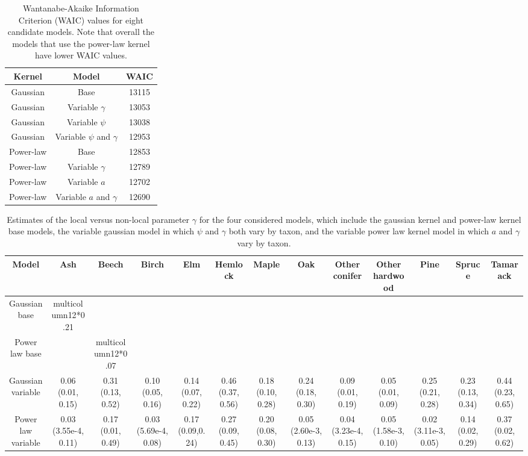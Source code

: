 
\begin{table}
\begin{center}
\begin{tabular}{ccc} 
\toprule
Kernel    & Model                        & WAIC  \\ \midrule
Gaussian  & Base                         & 13115 \\
Gaussian  & Variable $\gamma$            & 13053 \\
Gaussian  & Variable $\psi$              & 13038 \\   
Gaussian  & Variable $\psi$ and $\gamma$ & 12953 \\
Power-law & Base                         & 12853 \\
Power-law & Variable $\gamma$            & 12789 \\
Power-law & Variable $a$                 & 12702 \\
Power-law & Variable $a$ and $\gamma$    & 12690 \\  \bottomrule
\end{tabular}
\caption{Wantanabe-Akaike Information Criterion (WAIC) values for
  eight candidate models. Note that overall the models that use the
  power-law kernel have lower WAIC values.}
\end{center}
\label{table:WAIC}
\vspace{2cm}
\end{table}


\begin{table}
\begin{center}
\begin{tabular}{ccccccccccccc} 
\toprule
Model & Ash & Beech & Birch & Elm & Hemlock & Maple & Oak & Other conifer &  Other hardwood & Pine & Spruce & Tamarack \\ \midrule
Gaussian base      & multicolumn{12}{*}{0.21} \\   
Power law base     & & multicolumn{12}{*}{0.07} \\   
Gaussian variable  & 0.06 (0.01, 0.15) & 0.31 (0.13, 0.52) & 0.10 (0.05, 0.16) & 0.14 (0.07, 0.22) & 0.46 (0.37, 0.56) & 0.18 (0.10, 0.28) & 0.24 (0.18, 0.30) & 0.09 (0.01, 0.19) & 0.05 (0.01, 0.09) & 0.25 (0.21, 0.28) & 0.23 (0.13, 0.34) & 0.44 (0.23, 0.65) \\   
Power law variable & 0.03 (3.55e-4, 0.11) & 0.17 (0.01, 0.49) & 0.03 (5.69e-4, 0.08) & 0.17 (0.09,0.24)& 0.27 (0.09, 0.45) & 0.20 (0.08, 0.30) & 0.05 (2.60e-3, 0.13) & 0.04 (3.23e-4, 0.15) & 0.05 (1.58e-3, 0.10) & 0.02 (3.11e-3, 0.05) & 0.14 (0.02, 0.29) & 0.37 (0.02, 0.62) \\   \bottomrule
\end{tabular}
\caption{Estimates of the local versus non-local parameter $\gamma$ for the four considered models, which include the gaussian kernel and power-law kernel base models, the variable gaussian model in which $\psi$ and $\gamma$ both vary by taxon, and the variable power law kernel model in which $a$ and $\gamma$ vary by taxon.}
\end{center}
\label{table:gamma}
\vspace{2cm}
\end{table}